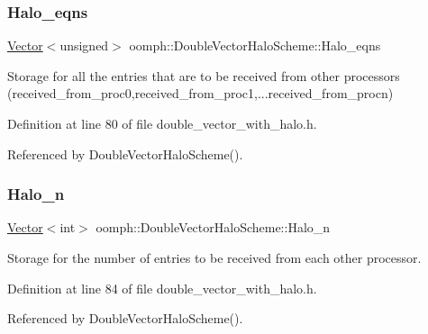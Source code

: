 \subsubsection{\texorpdfstring{Halo\+\_\+eqns}{Halo\_eqns}}
{\footnotesize\ttfamily \hyperlink{classoomph_1_1Vector}{Vector}$<$unsigned$>$ oomph\+::\+Double\+Vector\+Halo\+Scheme\+::\+Halo\+\_\+eqns\hspace{0.3cm}{\ttfamily [private]}}



Storage for all the entries that are to be received from other processors (received\+\_\+from\+\_\+proc0,received\+\_\+from\+\_\+proc1,...received\+\_\+from\+\_\+procn) 



Definition at line 80 of file double\+\_\+vector\+\_\+with\+\_\+halo.\+h.



Referenced by Double\+Vector\+Halo\+Scheme().

\mbox{\label{classoomph_1_1DoubleVectorHaloScheme_a47895cdeb23fef294e0facf880847063}} 
\subsubsection{\texorpdfstring{Halo\+\_\+n}{Halo\_n}}
{\footnotesize\ttfamily \hyperlink{classoomph_1_1Vector}{Vector}$<$int$>$ oomph\+::\+Double\+Vector\+Halo\+Scheme\+::\+Halo\+\_\+n\hspace{0.3cm}{\ttfamily [private]}}



Storage for the number of entries to be received from each other processor. 



Definition at line 84 of file double\+\_\+vector\+\_\+with\+\_\+halo.\+h.



Referenced by Double\+Vector\+Halo\+Scheme().

\mbox{\label{classoomph_1_1DoubleVectorHaloScheme_a7e8278718224d7348051443805bf145e}} 
